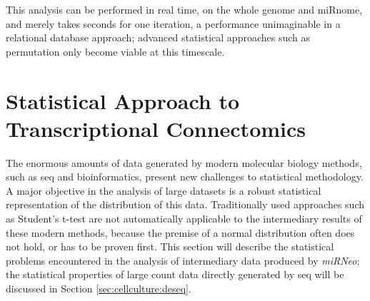 This analysis can be performed in real time, on the whole genome and miRnome, and merely takes seconds for one iteration, a performance unimaginable in a relational database approach; advanced statistical approaches such as permutation only become viable at this timescale.


\section{Statistical Approach to Transcriptional Connectomics}
The enormous amounts of data generated by modern molecular biology methods, such as \ac{seq} and bioinformatics, present new challenges to statistical methodology. A major objective in the analysis of large datasets is a robust statistical representation of the distribution of this data. Traditionally used approaches such as Student's t-test are not automatically applicable to the intermediary results of these modern methods, because the premise of a normal distribution often does not hold, or has to be proven first. This section will describe the statistical problems encountered in the analysis of intermediary data produced by \textit{miRNeo}; the statistical properties of large count data directly generated by \ac{seq} will be discussed in Section \ref{sec:cellculture:deseq}.

